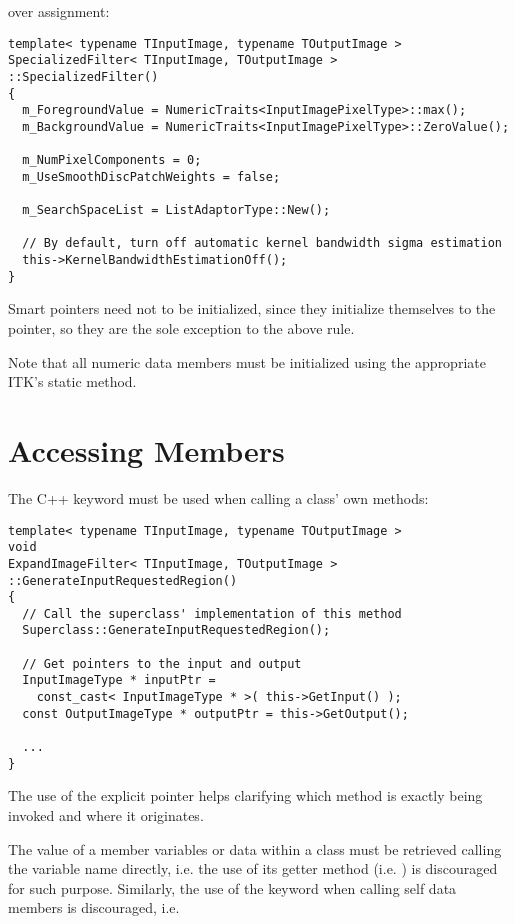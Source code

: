 over assignment:

\small
\begin{verbatim}
template< typename TInputImage, typename TOutputImage >
SpecializedFilter< TInputImage, TOutputImage >
::SpecializedFilter()
{
  m_ForegroundValue = NumericTraits<InputImagePixelType>::max();
  m_BackgroundValue = NumericTraits<InputImagePixelType>::ZeroValue();

  m_NumPixelComponents = 0;
  m_UseSmoothDiscPatchWeights = false;

  m_SearchSpaceList = ListAdaptorType::New();

  // By default, turn off automatic kernel bandwidth sigma estimation
  this->KernelBandwidthEstimationOff();
}
\end{verbatim}
\normalsize

Smart pointers need not to be initialized, since they initialize themselves
to the  pointer, so they are the sole exception to the above rule.

Note that all numeric data members must be initialized using the appropriate
ITK's  static method.


\section{Accessing Members}
\label{sec:Accessing Members}

The C++ keyword  must be used when calling a class' own methods:

\small
\begin{verbatim}
template< typename TInputImage, typename TOutputImage >
void
ExpandImageFilter< TInputImage, TOutputImage >
::GenerateInputRequestedRegion()
{
  // Call the superclass' implementation of this method
  Superclass::GenerateInputRequestedRegion();

  // Get pointers to the input and output
  InputImageType * inputPtr =
    const_cast< InputImageType * >( this->GetInput() );
  const OutputImageType * outputPtr = this->GetOutput();

  ...
}
\end{verbatim}
\normalsize

The use of the explicit  pointer helps clarifying which method is
exactly being invoked and where it originates.

The value of a member variables or data within a class must be retrieved calling
the variable name directly, i.e. the use of its getter method (i.e.
) is discouraged for such purpose. Similarly, the use of the
 keyword when calling self data members is discouraged, i.e.


